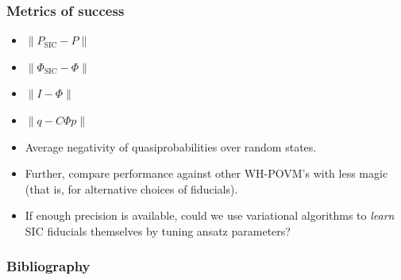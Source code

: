 \documentclass{beamer}
\begin{document}
\begin{frame}
\frametitle{Metrics of success}
\begin{itemize}
	\item $\lVert P_{\text{SIC}}-P	\rVert$
	\item $ \lVert \Phi_{\text{SIC}}-\Phi	\rVert$
	\item $\lVert I - \Phi	\rVert$
	\item $\lVert q - C\Phi p	\rVert$
	\item Average negativity of quasiprobabilities over random states.
	\item Further, compare performance against other WH-POVM's with less magic (that is, for alternative choices of fiducials).
	\item If enough precision is available, could we use variational algorithms to \emph{learn} SIC fiducials themselves by tuning ansatz parameters?
\end{itemize}	
\end{frame}



\begin{frame}[allowframebreaks]
\frametitle{Bibliography}
 

\end{frame}
\end{document}
